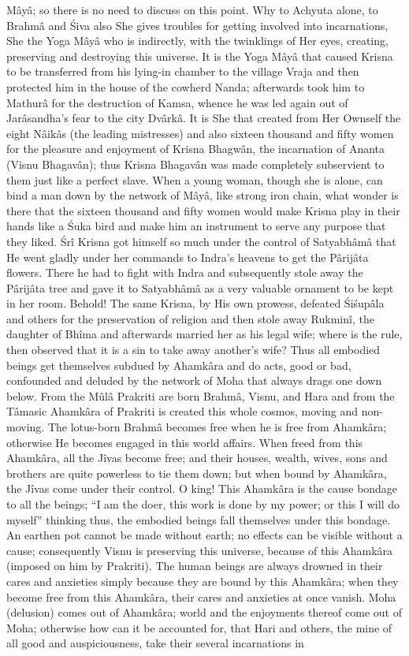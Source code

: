 M\^ay\^a; so there is no need to discuss on this point. Why to Achyuta alone, to Brahm\^a and \'Siva also She gives troubles for getting involved into incarnations, She the Yoga M\^ay\^a who is indirectly, with the twinklings of Her eyes, creating, preserving and destroying this universe. It is the Yoga M\^ay\^a that caused Krisna to be transferred from his lying-in chamber to the village Vraja and then protected him in the house of the cowherd Nanda; afterwards took him to Mathur\^a for the destruction of Kamsa, whence he was led again out of Jar\^asandha's fear to the city Dv\^ark\^a. It is She that created from Her Ownself the eight N\^aik\^as (the leading mistresses) and also sixteen thousand and fifty women for the pleasure and enjoyment of Krisna Bhagw\^an, the incarnation of Ananta (Visnu Bhagav\^an); thus Krisna Bhagav\^an was made completely subservient to them just like a perfect slave. When a young woman, though she is alone, can bind a man down by the network of M\^ay\^a, like strong iron chain, what wonder is there that the sixteen thousand and fifty women would make Krisna play in their hands like a \'Suka bird and make him an instrument to serve any purpose that they liked. \'Sr\^i Krisna got himself so much under the control of Satyabh\^am\^a that He went gladly under her commands to Indra's heavens to get the P\^arij\^ata flowers. There he had to fight with Indra and subsequently stole away the P\^arij\^ata tree and gave it to Satyabh\^am\^a as a very valuable ornament to be kept in her room. Behold! The same Krisna, by His own prowess, defeated \'Si\'sup\^ala and others for the preservation of religion and then stole away Rukmin\^i, the daughter of Bh\^ima and afterwards married her as his legal wife; where is the rule, then observed that it is a sin to take away another's wife? Thus all embodied beings get themselves subdued by Ahamk\^ara and do acts, good or bad, confounded and deluded by the network of Moha that always drags one down below. From the M\^ul\^a Prakriti are born Brahm\^a, Visnu, and Hara and from the T\^amasic Ahamk\^ara of Prakriti is created this whole cosmos, moving and non-moving. The lotus-born Brahm\^a becomes free when he is free from Ahamk\^ara; otherwise He becomes engaged in this world affairs. When freed from this Ahamk\^ara, all the J\^ivas become free; and their houses, wealth, wives, sons and brothers are quite powerless to tie them down; but when bound by Ahamk\^ara, the J\^ivas come under their control. O king! This Ahamk\^ara is the cause bondage to all the beings; ``I am the doer, this work is done by my power; or this I will do myself'' thinking thus, the embodied beings fall themselves under this bondage. An earthen pot cannot be made without earth; no effects can be visible without a cause; consequently Visnu is preserving this universe, because of this Ahamk\^ara (imposed on him by Prakriti). The human beings are always drowned in their cares and anxieties simply because they are bound by this Ahamk\^ara; when they become free from this Ahamk\^ara, their cares and anxieties at once vanish. Moha (delusion) comes out of Ahamk\^ara; world and the enjoyments thereof come out of Moha; otherwise how can it be accounted for, that Hari and others, the mine of all good and auspiciousness, take their several incarnations in 